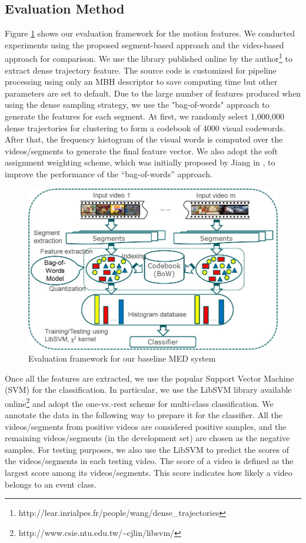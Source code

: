 \subsection{Evaluation Method}
\label{experimentalsetup:2}
%
Figure \ref{framework} shows our evaluation framework for the motion features. We conducted experiments using the proposed segment-based approach and the video-based approach for comparison. We use the library published online by the author\footnote{http://lear.inrialpes.fr/people/wang/dense\_trajectories} to extract dense trajectory feature. The source code is customized for pipeline processing using only an MBH descriptor to save computing time but other parameters are set to default. Due to the large number of features produced when using the dense sampling strategy, we use the "bag-of-words" approach to generate the features for each segment. At first, we randomly select 1,000,000 dense trajectories for clustering to form a codebook of 4000 visual codewords. After that, the frequency histogram of the visual words is computed over the videos/segments to generate the final feature vector. We also adopt the soft assignment weighting scheme, which was initially proposed by Jiang in \cite{Jiang:2007:TOB}, to improve the performance of the ``bag-of-words'' approach.
\begin{figure}
	\centering
	\includegraphics[width=1\textwidth]{baseline_framework.jpg}
	\caption{Evaluation framework for our baseline MED system}
	\label{framework}
\end{figure}

Once all the features are extracted, we use the popular Support Vector Machine (SVM) for the classification. In particular, we use the LibSVM library available online\footnote{http://www.csie.ntu.edu.tw/{\textasciitilde}cjlin/libsvm/} and adopt the one-vs.-rest scheme for multi-class classification. We annotate the data in the following way to prepare it for the classifier. All the videos/segments from positive videos are considered positive samples, and the remaining videos/segments (in the development set) are chosen as the negative samples. For testing purposes, we also use the LibSVM to predict the scores of the videos/segments in each testing video. The score of a video is defined as the largest score among its videos/segments. This score indicates how likely a video belongs to an event class.

